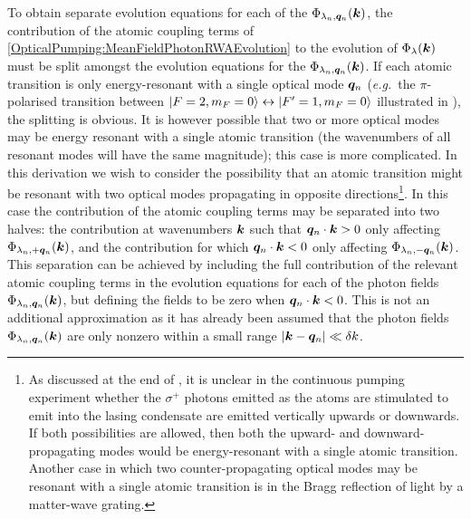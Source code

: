 To obtain separate evolution equations for each of the $\Phi_{\lambda_n, \bm{q}_n}(\bm{k})$, the contribution of the atomic coupling terms of \eqref{OpticalPumping:MeanFieldPhotonRWAEvolution} to the evolution of $\Phi_\lambda(\bm{k})$ must be split amongst the evolution equations for the $\Phi_{\lambda_n, \bm{q}_n}(\bm{k})$.  If each atomic transition is only energy-resonant with a single optical mode $\bm{q}_n$ (\emph{e.g.}\ the $\pi$-polarised transition between ${\left|F=2, m_F=0\right>} \leftrightarrow {\ensuremath{\left|F'=1, m_F=0\right>}}$ illustrated in ), the splitting is obvious.  It is however possible that two or more optical modes may be energy resonant with a single atomic transition (the wavenumbers of all resonant modes will have the same magnitude); this case is more complicated.  In this derivation we wish to consider the possibility that an atomic transition might be resonant with two optical modes propagating in opposite directions\footnote{As discussed at the end of , it is unclear in the continuous pumping experiment whether the $\sigma^+$ photons emitted as the atoms are stimulated to emit into the lasing condensate are emitted vertically upwards or downwards.  If both possibilities are allowed, then both the upward- and downward-propagating modes would be energy-resonant with a single atomic transition.  Another case in which two counter-propagating optical modes may be resonant with a single atomic transition is in the Bragg reflection of light by a matter-wave grating.}.  In this case the contribution of the atomic coupling terms may be separated into two halves: the contribution at wavenumbers $\bm{k}$ such that $\bm{q}_n \cdot \bm{k} > 0$ only affecting $\Phi_{\lambda_n, +\bm{q}_n}(\bm{k})$, and the contribution for which $\bm{q}_n \cdot \bm{k} < 0$ only affecting $\Phi_{\lambda_n, -\bm{q}_n}(\bm{k})$.  This separation can be achieved by including the full contribution of the relevant atomic coupling terms in the evolution equations for each of the photon fields $\Phi_{\lambda_n, \bm{q}_n}(\bm{k})$, but defining the fields to be zero when $\bm{q}_n \cdot \bm{k} < 0$.  This is not an additional approximation as it has already been assumed that the photon fields $\Phi_{\lambda_n, \bm{q}_n}(\bm{k})$ are only nonzero within a small range $\left|\bm{k} - \bm{q}_n\right|\ll \delta k$.  


